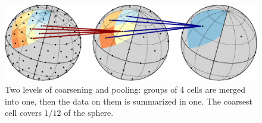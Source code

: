\documentclass[final,twocolumn,3p,times,sort&compress]{elsarticle}
\newcommand{\1}{\b{1}}              %
\newcommand{\0}{\b{0}}              %
\begin{document}

\begin{figure}
	\centering
	\includegraphics[width=\linewidth]{figure_pooling_svg}
	\caption{Two levels of coarsening and pooling: groups of 4 cells are merged into one, then the data on them is summarized in one. The coarsest cell covers $1/12$ of the sphere.}
	\label{fig:pooling}
\end{figure}


\end{document}
